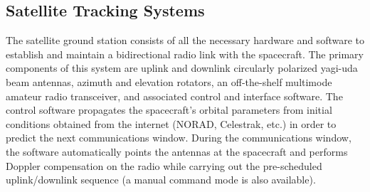\documentclass[nocover]            %
{CSLI}                       %
\begin{document}
\subsection{Satellite Tracking Systems}
The satellite ground station consists of all the necessary hardware and software to establish and maintain a bidirectional radio link with the spacecraft. The primary components of this system are uplink and downlink circularly polarized yagi-uda beam antennas, azimuth and elevation rotators, an off-the-shelf multimode amateur radio transceiver, and associated control and interface software. The control software propagates the spacecraft's orbital parameters from initial conditions obtained from the internet (NORAD, Celestrak, etc.) in order to predict the next communications window. During the communications window, the software automatically points the antennas at the spacecraft and performs Doppler compensation on the radio while carrying out the pre-scheduled uplink/downlink sequence (a manual command mode is also available).
\end{document}
